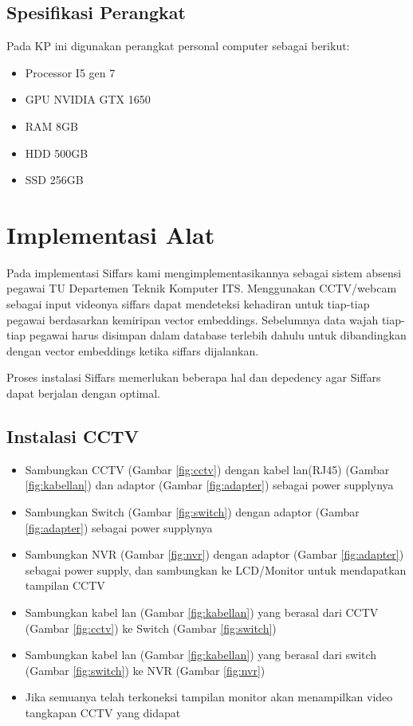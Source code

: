 \subsection{Spesifikasi Perangkat}
Pada KP ini digunakan perangkat personal computer sebagai berikut:
\begin{itemize}
  \item Processor I5 gen 7
  \item GPU NVIDIA GTX 1650
  \item RAM 8GB
  \item HDD 500GB
  \item SSD 256GB
\end{itemize}

\section{Implementasi Alat}

Pada implementasi Siffars kami mengimplementasikannya sebagai sistem absensi pegawai TU Departemen
Teknik Komputer ITS. Menggunakan CCTV/webcam sebagai input videonya siffars dapat mendeteksi kehadiran untuk
tiap-tiap pegawai berdasarkan kemiripan vector embeddings. Sebelumnya data wajah tiap-tiap pegawai harus
disimpan dalam database terlebih dahulu untuk dibandingkan dengan vector embeddings ketika siffars dijalankan.

Proses instalasi Siffars memerlukan beberapa hal dan depedency agar Siffars dapat berjalan dengan optimal.

\subsection{Instalasi CCTV}
\begin{itemize}
  \item Sambungkan CCTV (Gambar \ref{fig:cctv}) dengan kabel lan(RJ45) (Gambar \ref{fig:kabellan}) dan adaptor (Gambar \ref{fig:adapter}) sebagai power supplynya
  \item Sambungkan Switch (Gambar \ref{fig:switch}) dengan adaptor (Gambar \ref{fig:adapter}) sebagai power supplynya
  \item Sambungkan NVR (Gambar \ref{fig:nvr}) dengan adaptor (Gambar \ref{fig:adapter}) sebagai power supply, dan sambungkan ke LCD/Monitor untuk mendapatkan tampilan CCTV
  \item Sambungkan kabel lan (Gambar \ref{fig:kabellan}) yang berasal dari CCTV (Gambar \ref{fig:cctv}) ke Switch (Gambar \ref{fig:switch})
  \item Sambungkan kabel lan (Gambar \ref{fig:kabellan}) yang berasal dari switch (Gambar \ref{fig:switch}) ke NVR (Gambar \ref{fig:nvr})
  \item Jika semuanya telah terkoneksi tampilan monitor akan menampilkan video tangkapan CCTV yang didapat
\end{itemize}

